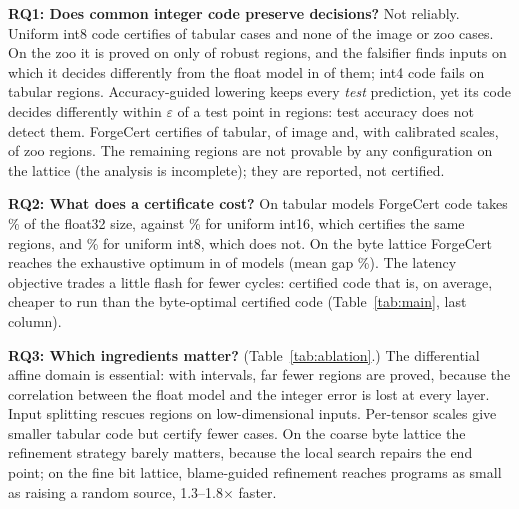 \textbf{RQ1: Does common integer code preserve decisions?} Not reliably. Uniform int8 code certifies \FCTabularUniformIntEightCertified{} of \FCTabularCases{} tabular cases and none of the image or zoo cases. On the zoo it is proved on only \FCZooUniformIntEightProved{} of \FCZooRobust{} robust regions, and the falsifier finds inputs on which it decides differently from the float model in \FCZooUniformIntEightCex{} of them; int4 code fails on \FCTabularUniformIntFourCex{} tabular regions. Accuracy-guided lowering keeps every \emph{test} prediction, yet its code decides differently within $\varepsilon$ of a test point in \FCTabularAccuracyGuidedCex{} regions: test accuracy does not detect them. ForgeCert certifies \FCTabularForgecertProved{} of \FCTabularRobust{} tabular, \FCImageForgecertProved{} of \FCImageRobust{} image and, with calibrated scales, \FCZooForgecertCalibratedProved{} of \FCZooRobust{} zoo regions. The remaining regions are not provable by any configuration on the lattice (the analysis is incomplete); they are reported, not certified.

\textbf{RQ2: What does a certificate cost?} On tabular models ForgeCert code takes \FCTabularForgecertFlash\% of the float32 size, against \FCTabularUniformIntSixteenFlash\% for uniform int16, which certifies the same regions, and \FCTabularUniformIntEightFlash\% for uniform int8, which does not. On the byte lattice ForgeCert reaches the exhaustive optimum in \FCOptimumExact{} of \FCOptimumCases{} models (mean gap \FCOptimumGap\%). The latency objective trades a little flash for fewer cycles: certified code that is, on average, cheaper to run than the byte-optimal certified code (Table~\ref{tab:main}, last column).

\begin{table}[t]
\centering\scriptsize
\FCTableAblation
\caption{Ablations on the tabular and image suites (variants not run on CIFAR-10 are omitted from the counts).}
\label{tab:ablation}
\end{table}

\textbf{RQ3: Which ingredients matter?} (Table~\ref{tab:ablation}.) The differential affine domain is essential: with intervals, far fewer regions are proved, because the correlation between the float model and the integer error is lost at every layer. Input splitting rescues regions on low-dimensional inputs. Per-tensor scales give smaller tabular code but certify fewer cases. On the coarse byte lattice the refinement strategy barely matters, because the local search repairs the end point; on the fine bit lattice, blame-guided refinement reaches programs as small as raising a random source, 1.3--1.8$\times$ faster.

